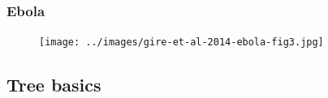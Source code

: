 
\begin{frame}
    \frametitle{Ebola}
    \begin{figure}
        \begin{center}
        \texttt{[image: ../images/gire-et-al-2014-ebola-fig3.jpg]}
        \caption{\tiny {}}
        \end{center}
    \end{figure}
\end{frame}




\subsection{Tree basics}

